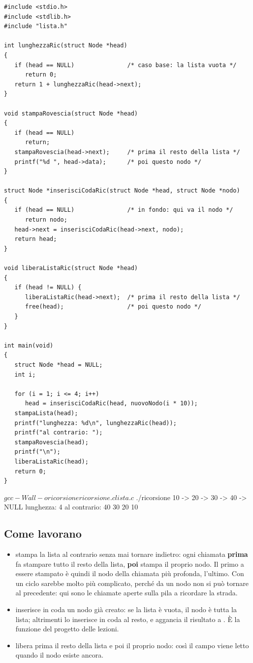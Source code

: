 \begin{lstlisting}[style=c, name=ricorsione.c]
#include <stdio.h>
#include <stdlib.h>
#include "lista.h"

int lunghezzaRic(struct Node *head)
{
   if (head == NULL)               /* caso base: la lista vuota */
      return 0;
   return 1 + lunghezzaRic(head->next);
}

void stampaRovescia(struct Node *head)
{
   if (head == NULL)
      return;
   stampaRovescia(head->next);     /* prima il resto della lista */
   printf("%d ", head->data);      /* poi questo nodo */
}

struct Node *inserisciCodaRic(struct Node *head, struct Node *nodo)
{
   if (head == NULL)               /* in fondo: qui va il nodo */
      return nodo;
   head->next = inserisciCodaRic(head->next, nodo);
   return head;
}

void liberaListaRic(struct Node *head)
{
   if (head != NULL) {
      liberaListaRic(head->next);  /* prima il resto della lista */
      free(head);                  /* poi questo nodo */
   }
}

int main(void)
{
   struct Node *head = NULL;
   int i;

   for (i = 1; i <= 4; i++)
      head = inserisciCodaRic(head, nuovoNodo(i * 10));
   stampaLista(head);
   printf("lunghezza: %d\n", lunghezzaRic(head));
   printf("al contrario: ");
   stampaRovescia(head);
   printf("\n");
   liberaListaRic(head);
   return 0;
}
\end{lstlisting}

\begin{console}
$ gcc -Wall -o ricorsione ricorsione.c lista.c
$ ./ricorsione
10 -> 20 -> 30 -> 40 -> NULL
lunghezza: 4
al contrario: 40 30 20 10
\end{console}

\subsection{Come lavorano}

\begin{itemize}
  \item {} stampa la lista al contrario senza mai tornare
        indietro: ogni chiamata \textbf{prima} fa stampare tutto il resto
        della lista, \textbf{poi} stampa il proprio nodo. Il primo a essere
        stampato è quindi il nodo della chiamata più profonda, l'ultimo. Con
        un ciclo sarebbe molto più complicato, perché da un nodo non si può
        tornare al precedente: qui sono le chiamate aperte sulla pila a
        ricordare la strada.
  \item {} inserisce in coda un nodo già creato: se la
        lista è vuota, il nodo è tutta la lista; altrimenti lo inserisce in
        coda al resto, e aggancia il risultato a . È la
        funzione  del progetto delle lezioni.
  \item {} libera prima il resto della lista e poi il
        proprio nodo: così il campo  viene letto quando il nodo
        esiste ancora.
\end{itemize}

